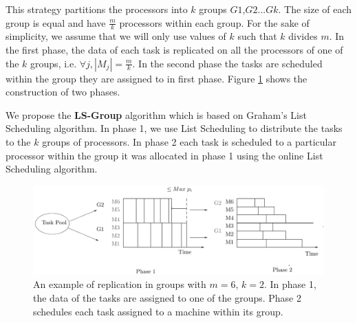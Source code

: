 \documentclass[10pt, conference, compsocconf]{IEEEtran}
\begin{document}
This strategy partitions the processors into $k$ groups
$G1$,$G2$...$Gk$. The size of each group is equal and have
$\frac{m}{k}$ processors within each group. For the sake of
simplicity, we assume that we will only use values of $k$ such that
$k$ divides $m$. In the first phase, the data of each task is
replicated on all the processors of one of the $k$ groups,
i.e. $\forall j, |M_j|= \frac{m}{k}$. In the second phase the tasks
are scheduled within the group they are assigned to in first phase.
Figure \ref{fig:Model 3} shows the construction of two phases.

We propose the \textbf{LS-Group} algorithm which is based on Graham's
List Scheduling algorithm. In phase 1, we use List Scheduling to
distribute the tasks to the $k$ groups of processors. In phase 2 each
task is scheduled to a particular processor within the group it was
allocated in phase 1 using the online List Scheduling algorithm.

\begin{figure}[htp] 
\centering
\includegraphics[width=\linewidth]{model3.pdf}
\caption{An example of replication in groups with $m = 6$, $k = 2$. In
  phase 1, the data of the tasks are assigned to one of the
  groups. Phase 2 schedules each task assigned to a machine within its
  group.}
\label{fig:Model 3}
\end{figure}
\end{document}
